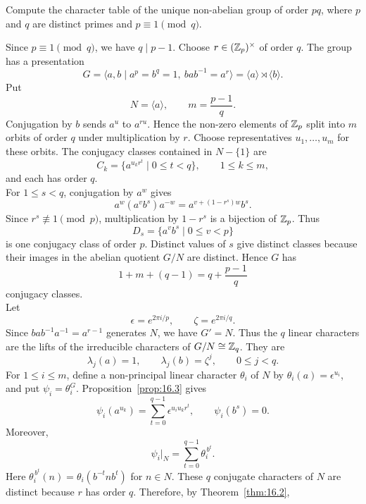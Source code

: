\documentclass[../Odyssey_Project.tex]{subfiles}
\begin{document}
\begin{exercise}
\label{ex:16.6}
Compute the character table of the unique non-abelian group of order $pq$, where $p$ and $q$ are distinct primes and $p \equiv 1 \pmod{q}$.
\end{exercise}
\begin{solution}
    Since $p\equiv1\pmod q$, we have $q\mid p-1$. Choose $r\in(\mathbb{Z}_p)^\times$ of order $q$. The group has a presentation
    \[
        G=\langle a,b\mid a^p=b^q=1,\ bab^{-1}=a^r\rangle
        =
        \langle a\rangle\rtimes\langle b\rangle.
    \]
    Put
    \[
        N=\langle a\rangle,
        \qquad
        m=\frac{p-1}{q}.
    \]
    Conjugation by $b$ sends $a^u$ to $a^{ru}$. Hence the non-zero elements of $\mathbb{Z}_p$ split into $m$ orbits of order $q$ under multiplication by $r$. Choose representatives $u_1,\ldots,u_m$ for these orbits. The conjugacy classes contained in $N-\{1\}$ are
    \[
        C_k=\{a^{u_kr^t}\mid0\leq t<q\},
        \qquad
        1\leq k\leq m,
    \]
    and each has order $q$.\\
    For $1\leq s<q$, conjugation by $a^w$ gives
    \[
        a^w(a^vb^s)a^{-w}
        =
        a^{v+(1-r^s)w}b^s.
    \]
    Since $r^s\not\equiv1\pmod p$, multiplication by $1-r^s$ is a bijection of $\mathbb{Z}_p$. Thus
    \[
        D_s=\{a^vb^s\mid0\leq v<p\}
    \]
    is one conjugacy class of order $p$. Distinct values of $s$ give distinct classes because their images in the abelian quotient $G/N$ are distinct. Hence $G$ has
    \[
        1+m+(q-1)=q+\frac{p-1}{q}
    \]
    conjugacy classes.\\
    Let
    \[
        \epsilon=e^{2\pi i/p},
        \qquad
        \zeta=e^{2\pi i/q}.
    \]
    Since $bab^{-1}a^{-1}=a^{r-1}$ generates $N$, we have $G'=N$. Thus the $q$ linear characters are the lifts of the irreducible characters of $G/N\cong\mathbb{Z}_q$. They are
    \[
        \lambda_j(a)=1,
        \qquad
        \lambda_j(b)=\zeta^j,
        \qquad
        0\leq j<q.
    \]
    For $1\leq i\leq m$, define a non-principal linear character $\theta_i$ of $N$ by $\theta_i(a)=\epsilon^{u_i}$, and put $\psi_i=\theta_i^G$. Proposition~\ref{prop:16.3} gives
    \[
        \psi_i(a^{u_k})
        =
        \sum_{t=0}^{q-1}\epsilon^{u_i u_k r^t},
        \qquad
        \psi_i(b^s)=0.
    \]
    Moreover,
    \[
        \psi_i|_N
        =
        \sum_{t=0}^{q-1}\theta_i^{\,b^t}.
    \]
    Here $\theta_i^{\,b^t}(n)=\theta_i(b^{-t}nb^t)$ for $n\in N$.
    These $q$ conjugate characters of $N$ are distinct because $r$ has order $q$. Therefore, by Theorem~\ref{thm:16.2},

\end{solution}
\end{document}
